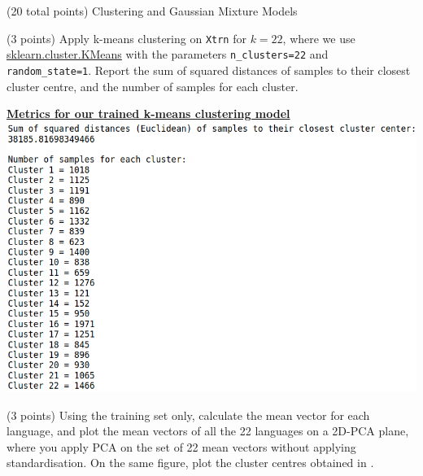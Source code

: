 \documentclass[12pt]{article}
\begin{document}
\begin{question}{(20 total points) Clustering and Gaussian Mixture Models}  


  


  \medskip
   \begin{subquestion}{(3 points)
       Apply k-means clustering on {\tt Xtrn} for $k = 22$, where we use
       \href{https://scikit-learn.org/0.19/modules/generated/sklearn.cluster.KMeans.html}{sklearn.cluster.KMeans}
       with the parameters {\tt n\_clusters=22} and {\tt random\_state=1}.
       Report the sum of squared distances of samples to their closest
       cluster centre, and the number of samples for each cluster.
     } \label{Q3.1}
   

      \begin{answerbox}{35em}
        \textbf{\underline{Metrics for our trained k-means clustering model}}
        \vspace{0.3cm}\\
         \includegraphics[width=1\textwidth]{images/q31.png}
      \end{answerbox}
  


   \end{subquestion}
   \begin{subquestion}{(3 points)
       Using the training set only,
       calculate the mean vector for each language, and plot the mean
       vectors of all the 22 languages on a 2D-PCA plane, where you
       apply PCA on the set of 22 mean vectors without applying
       standardisation.  
       On the same figure, plot the cluster centres obtained in .
     } \label{Q3.2}


\end{subquestion}
\end{question}
\end{document}
